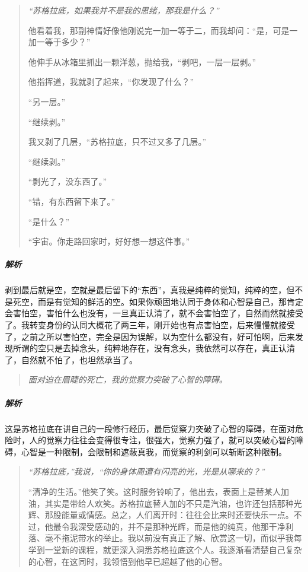 \begin{quotation}\it
    “苏格拉底，如果我并不是我的思绪，那我是什么？”

    他看着我，那副神情好像他刚说完一加一等于二，而我却问：“是，可是一加一等于多少？”

    他伸手从冰箱里抓出一颗洋葱，抛给我，“剥吧，一层一层剥。”

    他指挥道，我就剥了起来，“你发现了什么？”

    “另一层。”

    “继续剥。”

    我又剥了几层，“苏格拉底，只不过又多了几层。”

    “继续剥。”

    “剥光了，没东西了。”

    “错，有东西留下来了。”

    “是什么？”

    “宇宙。你走路回家时，好好想一想这件事。”
\end{quotation}

\subparagraph{解析} 剥到最后就是空，空就是最后留下的“东西”，真我是纯粹的觉知，纯粹的空，但不是死空，而是有觉知的鲜活的空。如果你顽固地认同于身体和心智是自己，那肯定会害怕空，害怕什么也没有，一旦真正认清了，就不会害怕空了，自然而然就接受了。我转变身份的认同大概花了两三年，刚开始也有点害怕空，后来慢慢就接受了，之前之所以害怕空，完全是因为误解，以为空什么都没有，好可怕啊，后来发现所谓的空只是去掉念头，纯粹地存在，没有念头，我依然可以存在，真正认清了，自然就不怕了，也坦然承当了。

\begin{quote}\it
    面对迫在眉睫的死亡，我的觉察力突破了心智的障碍。
\end{quote}

\subparagraph{解析} 这是苏格拉底在讲自己的一段修行经历，最后觉察力突破了心智的障碍，在面对危险时，人的觉察力往往会变得很专注，很强大，觉察力强了，就可以突破心智的障碍，心智是一种限制，会限制和遮蔽真我，而觉察的利剑可以斩断这种限制。

\begin{quotation}\it
    “苏格拉底，”我说，“你的身体周遭有闪亮的光，光是从哪来的？”

    “清净的生活。”他笑了笑。这时服务铃响了，他出去，表面上是替某人加油，其实是带给人欢笑。苏格拉底替人加的不只是汽油，也许还包括那种光辉、那股能量或情感。总之，人们离开时：往往会比来时还要快乐一点。不过，他最令我深受感动的，并不是那种光辉，而是他的纯真，他那干净利落、毫不拖泥带水的举止。我以前没有真正了解、欣赏这一切，而似乎我每学到一堂新的课程，就更深入洞悉苏格拉底这个人。我逐渐看清楚自己复杂的心智，在这同时，我领悟到他早已超越了他的心智。
\end{quotation}

